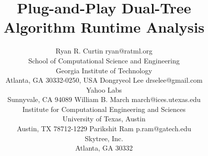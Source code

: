 \documentclass[twoside,11pt]{article} %
\begin{document}
\title{Plug-and-Play Dual-Tree Algorithm Runtime Analysis}

\author{\name Ryan R. Curtin \email ryan@ratml.org\\
  \addr School of Computational Science and Engineering\\
  Georgia Institute of Technology\\
  Atlanta, GA 30332-0250, USA
  \AND
  \name Dongryeol Lee \email drselee@gmail.com\\
  \addr Yahoo Labs\\
  Sunnyvale, CA 94089
  \AND
  \name William B. March \email march@ices.utexas.edu\\
  \addr Institute for Computational Engineering and Sciences\\
  University of Texas, Austin\\
  Austin, TX 78712-1229
  \AND
  \name Parikshit Ram \email p.ram@gatech.edu\\
  \addr Skytree, Inc.\\
  Atlanta, GA 30332
}




\maketitle
\end{document}
